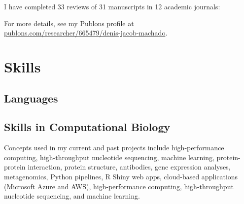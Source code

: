 \documentclass[11pt, letterpaper, sans]{moderncv}
\begin{document}
    I have completed 33 reviews of 31 manuscripts in 12 academic journals:\\
    \begin{multicols}{2}
    {\footnotesize
    }
    \end{multicols}
    For more details, see my Publons profile at  \href{https://publons.com/researcher/665479/denis-jacob-machado/}{publons.com/researcher/665479/denis-jacob-machado}.


\section{Skills}

\subsection{Languages}



\subsection{Skills in Computational Biology}

Concepts used in my current and past projects include high-performance computing, high-throughput nucleotide sequencing, machine learning, protein-protein interaction, protein structure, antibodies, gene expression analyses, metagenomics, Python pipelines, R Shiny web apps, cloud-based applications (Microsoft Azure and AWS), high-performance computing, high-throughput nucleotide sequencing, and machine learning.

\vspace{0.5em}
\end{document}
